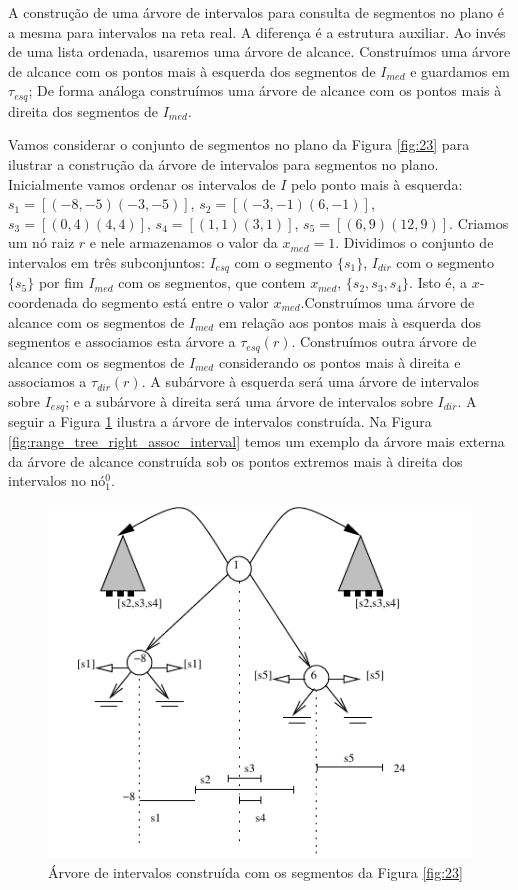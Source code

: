 A construção de uma árvore de intervalos para consulta de segmentos no plano é a mesma para intervalos na reta real. A diferença é a estrutura auxiliar. Ao invés de uma lista ordenada, usaremos uma árvore de alcance. Construímos uma árvore de alcance com os pontos mais à esquerda dos segmentos de $I_{med}$ e guardamos em $\tau_{esq}$; De forma análoga construímos uma árvore de alcance com os pontos mais à direita dos segmentos de $I_{med}$.

Vamos considerar o conjunto de segmentos no plano da Figura \ref{fig:23} para ilustrar a construção da árvore de intervalos para segmentos no plano.
Inicialmente vamos ordenar os intervalos de $I$ pelo ponto mais à esquerda: $s_1 = [(-8,-5)(-3,-5)]$, $s_2 =[(-3,-1)(6, -1)]$, $s_3 = [(0,4)(4,4)]$, $s_4 =[(1,1)(3,1)]$, $s_5 = [(6,9)(12,9)]$. Criamos um nó raiz $r$ e nele armazenamos o valor da $x_{med}  = 1$. Dividimos o conjunto de intervalos em três subconjuntos: $I_{esq}$ com o segmento $\{s_1\}$, $I_{dir}$ com o segmento $\{s_5\}$ por fim $I_{med}$ com os segmentos, que contem $x_{med}$, $\{ s_2, s_3, s_4\}$. Isto é, a $x$-coordenada do segmento está entre o valor $x_{med}$.Construímos uma árvore de alcance com os segmentos de $I_{med}$ em relação aos pontos mais à esquerda dos segmentos e associamos esta árvore a $\tau_{esq}(r)$. Construímos outra árvore de alcance com os segmentos de $I_{med}$ considerando os pontos mais à direita e associamos a $\tau_{dir}(r)$. A subárvore à esquerda será uma árvore de intervalos sobre $I_{esq}$; e a subárvore à direita será uma árvore de intervalos sobre $I_{dir}$. A seguir a Figura \ref{fig:24} ilustra a árvore de intervalos construída. Na Figura \ref{fig:range_tree_right_assoc_interval} temos um exemplo da árvore mais externa da árvore de alcance construída sob os pontos extremos mais à direita dos intervalos no nó$^0_1$.
 
\begin{figure}[h!]
    \begin{center}
        \includegraphics[scale=1.5]{images/interval_tree9.pdf}
    \end{center}
    \caption{ Árvore de intervalos construída com os segmentos da Figura \ref{fig:23}}
    \label{fig:24}
\end{figure}

